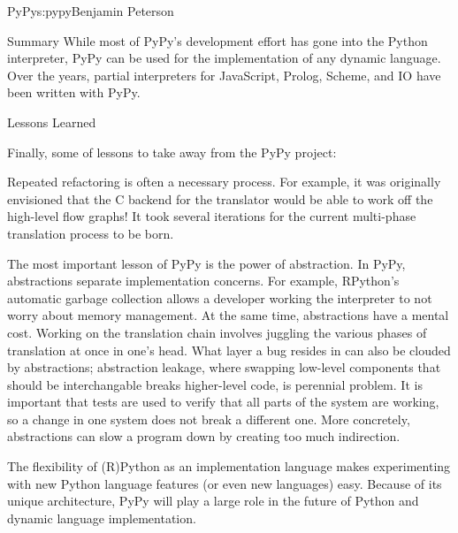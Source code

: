 \begin{aosachapter}{PyPy}{s:pypy}{Benjamin Peterson}
\begin{aosasect1}{Summary}
While most of PyPy's development effort has gone into the Python interpreter,
PyPy can be used for the implementation of any dynamic language. Over the years,
partial interpreters for JavaScript, Prolog, Scheme, and IO have been written
with PyPy.

\end{aosasect1}

\begin{aosasect1}{Lessons Learned}

Finally, some of lessons to take away from the PyPy project:

Repeated refactoring is often a necessary process. For example, it was
originally envisioned that the C backend for the translator would be able to
work off the high-level flow graphs! It took several iterations for the
current multi-phase translation process to be born.

The most important lesson of PyPy is the power of abstraction. In PyPy,
abstractions separate implementation concerns. For example, RPython's automatic
garbage collection allows a developer working the interpreter to not worry about
memory management. At the same time, abstractions have a mental cost. Working on
the translation chain involves juggling the various phases of translation at
once in one's head. What layer a bug resides in can also be clouded by
abstractions; abstraction leakage, where swapping low-level components that
should be interchangable breaks higher-level code, is perennial problem. It is
important that tests are used to verify that all parts of the system are working, so
a change in one system does not break a different one. More concretely,
abstractions can slow a program down by creating too much indirection.

The flexibility of (R)Python as an implementation language makes experimenting
with new Python language features (or even new languages) easy. Because of its
unique architecture, PyPy will play a large role in the future of Python and
dynamic language implementation.

\end{aosasect1}

\end{aosachapter}

